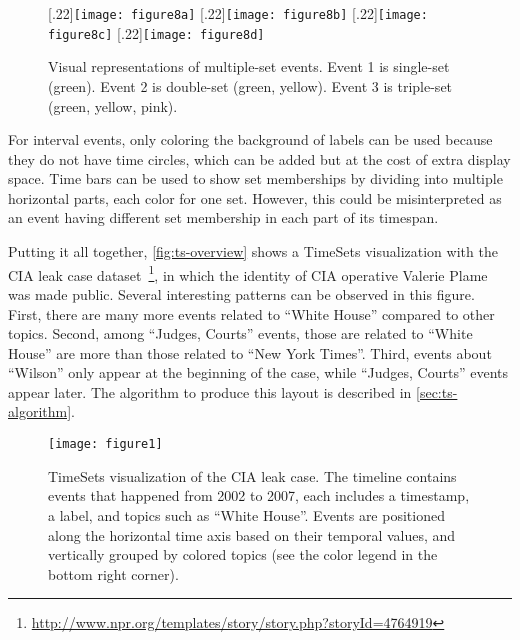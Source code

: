 \begin{figure}[!htb]
	\centering
	[.22\columnwidth]{\texttt{[image: figure8a]}}
	\hfill
	[.22\columnwidth]{\texttt{[image: figure8b]}}
	\hfill
	[.22\columnwidth]{\texttt{[image: figure8c]}}
	\hfill
	[.22\columnwidth]{\texttt{[image: figure8d]}}
	\caption{Visual representations of multiple-set events. Event 1 is single-set (green). Event 2 is double-set (green, yellow). Event 3 is triple-set (green, yellow, pink).}
	\label{fig:eventmembership}
\end{figure}

For interval events, only coloring the background of labels can be used because they do not have time circles, which can be added but at the cost of extra display space. Time bars can be used to show set memberships by dividing into multiple horizontal parts, each color for one set. However, this could be misinterpreted as an event having different set membership in each part of its timespan.

Putting it all together, \autoref{fig:ts-overview} shows a TimeSets visualization with the CIA leak case dataset~\footnote{\url{http://www.npr.org/templates/story/story.php?storyId=4764919}}, in which the identity of CIA operative Valerie Plame was made public. Several interesting patterns can be observed in this figure. First, there are many more events related to ``White House'' compared to other topics. Second, among ``Judges, Courts'' events, those are related to ``White House'' are more than those related to ``New York Times''. Third, events about ``Wilson'' only appear at the beginning of the case, while ``Judges, Courts'' events appear later.  The algorithm to produce this layout is described in \autoref{sec:ts-algorithm}. 

\begin{figure}[!htb]
	\centering
	\texttt{[image: figure1]}
	\caption{TimeSets visualization of the CIA leak case. The timeline contains events that happened from 2002 to 2007, each includes a timestamp, a label, and topics such as ``White House''. Events are positioned along the horizontal time axis based on their temporal values, and vertically grouped by colored topics (see the color legend in the bottom right corner).}
	\label{fig:ts-overview}
\end{figure}

